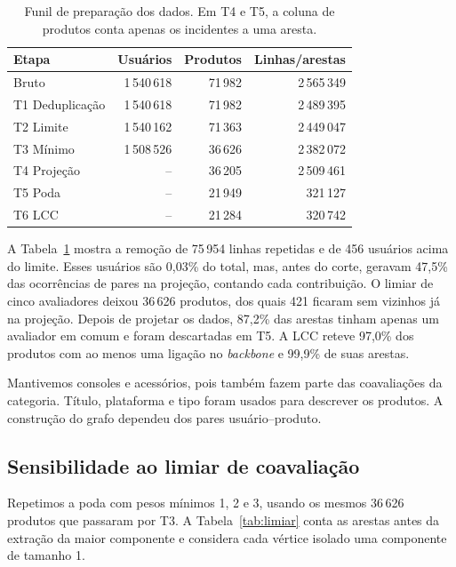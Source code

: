 \documentclass[sigconf,nonacm]{webmedia}
\begin{document}
\begin{table}[tbp]
\centering
\caption{Funil de preparação dos dados. Em T4 e T5, a coluna de produtos conta apenas os incidentes a uma aresta.}
\label{tab:funil}
\small
\setlength{\tabcolsep}{3.5pt}
\begin{tabular}{@{}lrrr@{}}
\toprule
Etapa & Usuários & Produtos & Linhas/arestas \\
\midrule
Bruto           & 1\,540\,618 & 71\,982 & 2\,565\,349 \\
T1 Deduplicação & 1\,540\,618 & 71\,982 & 2\,489\,395 \\
T2 Limite       & 1\,540\,162 & 71\,363 & 2\,449\,047 \\
T3 Mínimo       & 1\,508\,526 & 36\,626 & 2\,382\,072 \\
T4 Projeção     & --         & 36\,205 & 2\,509\,461 \\
T5 Poda         & --         & 21\,949 & 321\,127 \\
T6 LCC          & --         & 21\,284 & 320\,742 \\
\bottomrule
\end{tabular}
\end{table}

A Tabela~\ref{tab:funil} mostra a remoção de 75\,954 linhas
repetidas e de 456 usuários acima do limite. Esses usuários são
0,03\% do total, mas, antes do corte, geravam 47,5\% das
ocorrências de pares na projeção, contando cada contribuição. O
limiar de cinco avaliadores deixou 36\,626 produtos, dos quais
421 ficaram sem vizinhos já na projeção. Depois de projetar os
dados, 87,2\% das arestas tinham apenas um avaliador em comum e
foram descartadas em T5. A LCC reteve 97,0\% dos produtos com ao
menos uma ligação no \emph{backbone} e 99,9\% de suas arestas.

Mantivemos consoles e acessórios, pois também fazem parte das
coavaliações da categoria. Título, plataforma e tipo foram usados
para descrever os produtos. A construção do grafo dependeu dos pares
usuário--produto.

\subsection{Sensibilidade ao limiar de coavaliação}

Repetimos a poda com pesos mínimos 1, 2 e 3, usando os mesmos
36\,626 produtos que passaram por T3. A Tabela~\ref{tab:limiar}
conta as arestas antes da extração da maior componente e considera
cada vértice isolado uma componente de tamanho 1.
\end{document}
